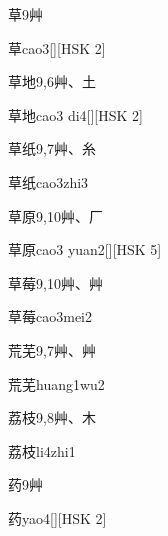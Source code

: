 \begin{entry}{草}{9}{⾋}
  \begin{phonetics}{草}{cao3}[][HSK 2]
  \end{phonetics}
\end{entry}

\begin{entry}{草地}{9,6}{⾋、⼟}
  \begin{phonetics}{草地}{cao3 di4}[][HSK 2]
  \end{phonetics}
\end{entry}

\begin{entry}{草纸}{9,7}{⾋、⽷}
  \begin{phonetics}{草纸}{cao3zhi3}
  \end{phonetics}
\end{entry}

\begin{entry}{草原}{9,10}{⾋、⼚}
  \begin{phonetics}{草原}{cao3 yuan2}[][HSK 5]
  \end{phonetics}
\end{entry}

\begin{entry}{草莓}{9,10}{⾋、⾋}
  \begin{phonetics}{草莓}{cao3mei2}
  \end{phonetics}
\end{entry}

\begin{entry}{荒芜}{9,7}{⾋、⾋}
  \begin{phonetics}{荒芜}{huang1wu2}
  \end{phonetics}
\end{entry}

\begin{entry}{荔枝}{9,8}{⾋、⽊}
  \begin{phonetics}{荔枝}{li4zhi1}
  \end{phonetics}
\end{entry}

\begin{entry}{药}{9}{⾋}
  \begin{phonetics}{药}{yao4}[][HSK 2]
  \end{phonetics}
\end{entry}

